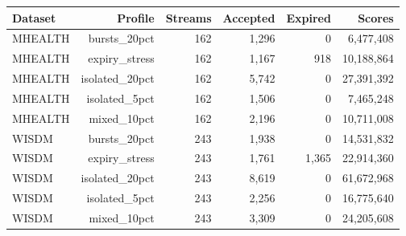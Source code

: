 \begin{tabular}{lrrrrr}
\toprule
Dataset & Profile & Streams & Accepted & Expired & Scores \\
\midrule
MHEALTH & bursts\_20pct & 162 & 1,296 & 0 & 6,477,408 \\
MHEALTH & expiry\_stress & 162 & 1,167 & 918 & 10,188,864 \\
MHEALTH & isolated\_20pct & 162 & 5,742 & 0 & 27,391,392 \\
MHEALTH & isolated\_5pct & 162 & 1,506 & 0 & 7,465,248 \\
MHEALTH & mixed\_10pct & 162 & 2,196 & 0 & 10,711,008 \\
WISDM & bursts\_20pct & 243 & 1,938 & 0 & 14,531,832 \\
WISDM & expiry\_stress & 243 & 1,761 & 1,365 & 22,914,360 \\
WISDM & isolated\_20pct & 243 & 8,619 & 0 & 61,672,968 \\
WISDM & isolated\_5pct & 243 & 2,256 & 0 & 16,775,640 \\
WISDM & mixed\_10pct & 243 & 3,309 & 0 & 24,205,608 \\
\bottomrule
\end{tabular}
